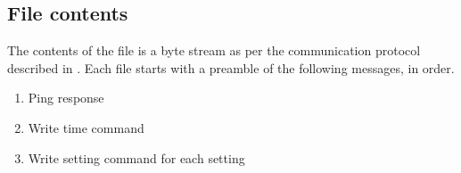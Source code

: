 \subsection{File contents}

The contents of the file is a byte stream as per the communication protocol described in .  Each file starts with a preamble of the following messages, in order.

\begin{enumerate}[nolistsep]
    \item Ping response
    \item Write time command
    \item Write setting command for each setting
\end{enumerate}

